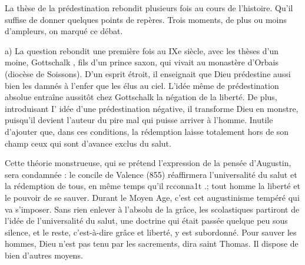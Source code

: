 La thèse de la prédestination rebondit plusieurs fois au cours de l'histoire. Qu'il suffise de donner quelques points de repères. Trois moments, de plus ou moins d'ampleurs, on marqué ce débat.

a)	La question rebondit une première fois au IXe siècle, avec les thèses d'un moine, Gottschalk , fils d'un prince saxon, qui vivait au monastère d'Orbais (diocèse de Soissons). D'un esprit étroit, il enseignait que Dieu prédestine aussi bien les damnés à l'enfer que les élus au ciel. L'idée même de prédestination absolue entraîne aussitôt chez Gottschalk la négation de la liberté. De plus, introduisant I' idée d'une prédestination négative, il transforme Dieu en monstre, puisqu'il devient l'auteur du pire mal qui puisse arriver à l'homme. Inutile d'ajouter que, dans ces conditions, la rédemption laisse totalement hors de son champ ceux qui sont d'avance exclus du salut.

Cette théorie monstrueuse, qui se prétend l'expression de la pensée d'Augustin, sera condamnée : le concile de Valence (855) réaffirmera l'universalité du salut et la rédemption de tous, en même temps qu'il rcconna1t .; tout homme la liberté et le pouvoir de se sauver. Durant le Moyen Age, c'est cet augustinisme tempéré qui va s'imposer. Sans rien enlever à l'absolu de la grâce, les scolastiques partiront de l'idée de l'universalité du salut, une doctrine qui était passée quelque peu sous silence, et le reste, c'est-à-dire grâce et liberté, y est subordonné. Pour sauver les hommes, Dieu n'est pas tenu par les sacrements, dira saint Thomas. Il dispose de bien d'autres moyens.

